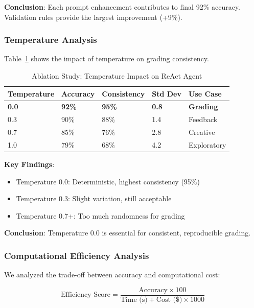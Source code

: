 \documentclass[runningheads]{llncs}
\begin{document}
\textbf{Conclusion}: Each prompt enhancement contributes to final 92\% accuracy. Validation rules provide the largest improvement (+9\%).

\subsubsection{Temperature Analysis}

Table~\ref{tab:ablation-temp} shows the impact of temperature on grading consistency.

\begin{table}[H]
\centering
\caption{Ablation Study: Temperature Impact on ReAct Agent}
\label{tab:ablation-temp}
\begin{tabular}{@{}p{}p{}p{}p{}p{}@{}}
\toprule
Temperature & Accuracy & Consistency & Std Dev & Use Case \\
\midrule
\textbf{0.0} & \textbf{92\%} & \textbf{95\%} & \textbf{0.8} & \textbf{Grading} \\
0.3 & 90\% & 88\% & 1.4 & Feedback \\
0.7 & 85\% & 76\% & 2.8 & Creative \\
1.0 & 79\% & 68\% & 4.2 & Exploratory \\
\bottomrule
\end{tabular}
\end{table}

\textbf{Key Findings}:
\begin{itemize}
    \item Temperature 0.0: Deterministic, highest consistency (95\%)
    \item Temperature 0.3: Slight variation, still acceptable
    \item Temperature 0.7+: Too much randomness for grading
\end{itemize}

\textbf{Conclusion}: Temperature 0.0 is essential for consistent, reproducible grading.

\subsubsection{Computational Efficiency Analysis}

We analyzed the trade-off between accuracy and computational cost:

\begin{equation}
\text{Efficiency Score} = \frac{\text{Accuracy} \times 100}{\text{Time (s)} + \text{Cost (\$)} \times 1000}
\end{equation}
\end{document}
